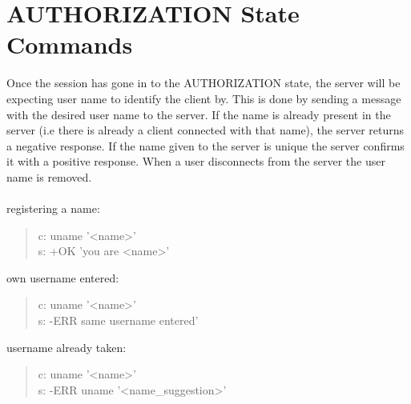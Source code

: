 \documentclass[a4paper,11pt]{article}
\begin{document}
\section{AUTHORIZATION State Commands}
%
%
Once the session has gone in to the AUTHORIZATION state, the server will be expecting user name to identify the client by. This is done by sending a message with the desired user name to the server. If the name is already present in the server (i.e there is already a client connected with that name), the server returns a negative response. If the name given to the server is unique the server confirms it with a positive response. When a user disconnects from the server the user name is removed.\\\\
registering a name:

\begin{quote}
  c: uname '<name>'\\
  s: +OK 'you are <name>'
\end{quote}
\noindent
own username entered:
\begin{quote}
  c: uname '<name>'\\
  s: -ERR same username entered'
\end{quote}
\noindent
username already taken:
\begin{quote}
  c: uname '<name>'\\
  s: -ERR uname '<name\_suggestion>'
\end{quote}
\end{document}
